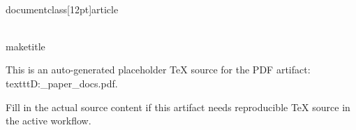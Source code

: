 ﻿\\documentclass[12pt]{article}
\begin{document}
\\maketitle

This is an auto-generated placeholder TeX source for the PDF artifact: \\texttt{D:\working_paper\DANNI\output\doc\zh_docs.pdf}.

Fill in the actual source content if this artifact needs reproducible TeX source in the active workflow.

\
\end{document}

